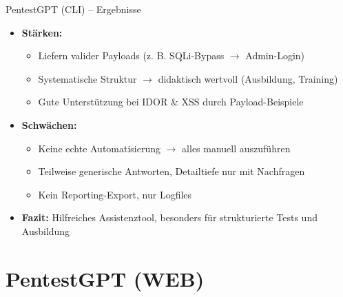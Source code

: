 \documentclass[
	aspectratio=169,	%
	onlytextwidth,		%
	t,					%
	]{beamer}
\begin{document}
\begin{frame}{PentestGPT (CLI) – Ergebnisse}
	\begin{itemize}
		\item \textbf{Stärken:}
		\begin{itemize}
			\item Liefern valider Payloads (z. B. SQLi-Bypass $\rightarrow$  Admin-Login)
			\item Systematische Struktur $\rightarrow$ didaktisch wertvoll (Ausbildung, Training)
			\item Gute Unterstützung bei IDOR \& XSS durch Payload-Beispiele
		\end{itemize}
		
		\item \textbf{Schwächen:}
		\begin{itemize}
			\item Keine echte Automatisierung $\rightarrow$  alles manuell auszuführen
			\item Teilweise generische Antworten, Detailtiefe nur mit Nachfragen
			\item Kein Reporting-Export, nur Logfiles
		\end{itemize}
		
		\item \textbf{Fazit:}  
		Hilfreiches Assistenztool, besonders für strukturierte Tests und Ausbildung
	\end{itemize}
\end{frame}












\section{PentestGPT (WEB)}
\end{document}
